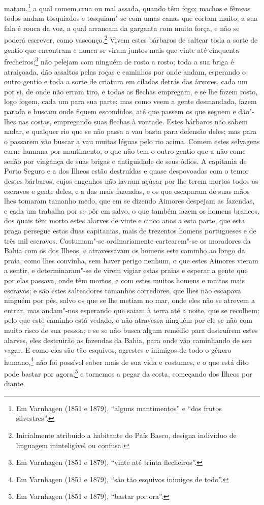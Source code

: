 matam,\footnote{ Em Varnhagen (1851 e 1879), ``alguns mantimentos'' e ``dos frutos
silvestres''.} a qual comem crua ou mal assada, quando têm fogo; machos e fêmeas todos
andam tosquiados e tosquiam"-se com umas canas que cortam muito; a sua fala é rouca da voz,
a qual arrancam da garganta com muita força, e não se poderá escrever, como
vasconço.\footnote{ Inicialmente atribuído a habitante do País Basco, designa indivíduo de
linguagem ininteligível ou confusa.} Vivem estes bárbaros de saltear toda a sorte de
gentio que encontram e nunca se viram juntos mais que vinte até cinquenta
frecheiros;\footnote{ Em Varnhagen (1851 e 1879), ``vinte até trinta flecheiros''.} não
pelejam com ninguém de rosto a rosto; toda a sua briga é atraiçoada, dão assaltos pelas
roças e caminhos por onde andam, esperando o outro gentio e toda a sorte de criatura em
ciladas detrás das árvores, cada um por si, de onde não erram tiro, e todas as flechas
empregam, e se lhe fazem rosto, logo fogem, cada um para sua parte; mas como veem a gente
desmandada, fazem parada e buscam onde fiquem escondidos, até que passem os que seguem e
dão"-lhes nas costas, empregando suas flechas à vontade. Estes bárbaros não sabem nadar, e
qualquer rio que se não passa a vau basta para defensão deles; mas para o passarem vão
buscar a vau muitas léguas pelo rio acima. Comem estes selvagens carne humana por
mantimento, o que não tem o outro gentio que a não come senão por vingança de suas brigas
e antiguidade de seus ódios. A capitania de Porto Seguro e a dos Ilheos estão destruídas e
quase despovoadas com o temor destes bárbaros, cujos engenhos não lavram açúcar por lhe
terem mortos todos os escravos e gente deles, e a das mais fazendas, e os que escaparam de
suas mãos lhes tomaram tamanho medo, que em se dizendo Aimores despejam as fazendas, e
cada um trabalha por se pôr em salvo, o que também fazem os homens brancos, dos quais têm
morto estes alarves de vinte e cinco anos a esta parte, que esta praga persegue estas duas
capitanias, mais de trezentos homens portugueses e de três mil escravos. Costumam"-se
ordinariamente cartearem"-se os moradores da Bahia com os dos Ilheos, e atravessavam os
homens este caminho ao longo da praia, como lhes convinha, sem haver perigo nenhum, o que
estes Aimores vieram a sentir, e determinaram"-se de virem vigiar estas praias e esperar a
gente que por elas passava, onde têm mortos, e com estes muitos homens e muitos mais
escravos; e são estes salteadores tamanhos corredores, que lhes não escapava ninguém por
pés, salvo os que se lhe metiam no mar, onde eles não se atrevem a entrar, mas andam"-nos
esperando que saiam à terra até a noite, que se recolhem; pelo que este caminho está
vedado, e não atravessa ninguém por ele se não com muito risco de sua pessoa; e se se não
busca algum remédio para destruírem estes alarves, eles destruirão as fazendas da Bahia,
para onde vão caminhando de seu vagar. E como eles são tão esquivos, agrestes e inimigos
de todo o gênero humano,\footnote{ Em Varnhagen (1851 e 1879), ``são tão esquivos inimigos
de todo''.} não foi possível saber mais de sua vida e costumes, e o que está dito pode
bastar por agora;\footnote{ Em Varnhagen (1851 e 1879), ``bastar por ora''.} e tornemos a
pegar da costa, começando dos Ilheos por diante.

